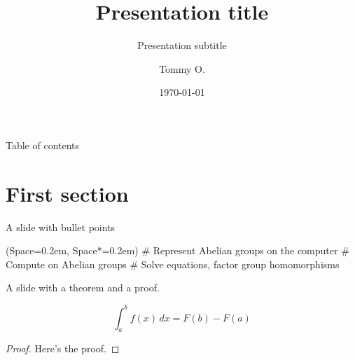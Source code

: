 \documentclass[12pt, aspectratio=149]{beamer}
\title{Presentation title}
\subtitle{Presentation subtitle}
\institute{University of Bergen}
\date{\today}
\author{Tommy O.}
\newcommand{\listSpace}{0.2em}
\theoremstyle{plain}
\begin{document}
\maketitle
{}
  
\begin{frame}{Table of contents}
	\tableofcontents
\end{frame}


\section{First section}
\begin{frame}[fragile]{A slide with bullet points}
	\begin{easylist}[itemize]
		\ListProperties(Space=\listSpace, Space*=\listSpace)
		# Represent Abelian groups on the computer
		# Compute on Abelian groups
		# Solve equations, factor group homomorphisms
	\end{easylist}
\end{frame}

\begin{frame}[fragile]{A slide with a theorem and a proof.}
\begin{theorem}[Integral]
	\begin{equation*}
		\int_{a}^{b} f(x) \, dx = F(b) - F(a)
	\end{equation*}
\end{theorem}
\begin{proof}
Here's the proof.
\end{proof}
\end{frame}
\end{document}
